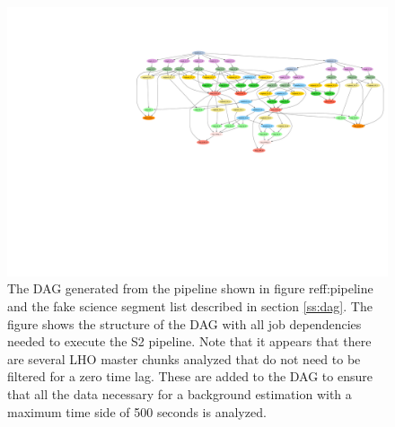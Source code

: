 \begin{figure}
\begin{center}
\hspace*{-0.2in}\includegraphics[width=\linewidth]{figures/pipeline/fake_segs_dag}
\end{center}
\caption{\label{f:fake_segs_dag}%
The DAG generated from the pipeline shown in figure ref{f:pipeline} and the
fake science segment list described in section \ref{ss:dag}. The figure shows
the structure of the DAG with all job dependencies needed to execute the S2
pipeline. Note that it appears that there are several LHO master chunks
analyzed that do not need to be filtered for a zero time lag.  These are added
to the DAG to ensure that all the data necessary for a background estimation
with a maximum time side of 500 seconds is analyzed.
}
\end{figure}

